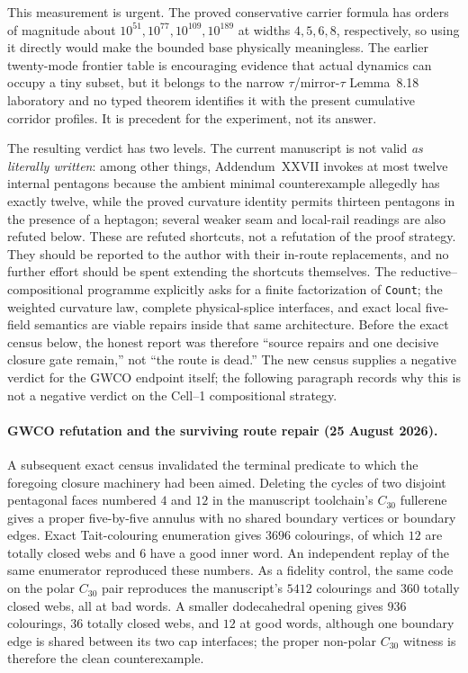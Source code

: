 \documentclass[11pt]{article}
\theoremstyle{definition}
\begin{document}
This measurement is urgent.  The proved conservative carrier formula has
orders of magnitude about $10^{51},10^{77},10^{109},10^{189}$ at widths
$4,5,6,8$, respectively, so using it directly would make the bounded base
physically meaningless.  The earlier twenty-mode frontier table is encouraging
evidence that actual dynamics can occupy a tiny subset, but it belongs to the
narrow $\tau$/mirror-$\tau$ Lemma~8.18 laboratory and no typed theorem identifies
it with the present cumulative corridor profiles.  It is precedent for the
experiment, not its answer.

The resulting verdict has two levels.  The current manuscript is not valid
\emph{as literally written}: among other things, Addendum~XXVII invokes at most
twelve internal pentagons because the ambient minimal counterexample allegedly
has exactly twelve, while the proved curvature identity permits thirteen
pentagons in the presence of a heptagon; several weaker seam and local-rail
readings are also refuted below.  These are refuted shortcuts, not a refutation
of the proof strategy.  They should be reported to the author with their
in-route replacements, and no further effort should be spent extending the
shortcuts themselves.  The reductive--compositional programme explicitly asks
for a finite factorization of \texttt{Count}; the weighted curvature law,
complete physical-splice interfaces, and exact local five-field semantics are
viable repairs inside that same architecture.  Before the exact census below,
the honest report was therefore ``source repairs and one decisive closure gate
remain,'' not ``the route is dead.''  The new census supplies a negative verdict
for the GWCO endpoint itself; the following paragraph records why this is not a
negative verdict on the Cell--1 compositional strategy.

\paragraph{GWCO refutation and the surviving route repair (25 August 2026).}
A subsequent exact census invalidated the terminal predicate to which the
foregoing closure machinery had been aimed.  Deleting the cycles of two
disjoint pentagonal faces numbered $4$ and $12$ in the manuscript toolchain's
$C_{30}$ fullerene gives a proper five-by-five annulus with no shared boundary
vertices or boundary edges.  Exact Tait-colouring enumeration gives $3696$
colourings, of which $12$ are totally closed webs and $6$ have a good inner
word.  An independent replay of the same enumerator reproduced these numbers.
As a fidelity control, the same code on the polar $C_{30}$ pair reproduces the
manuscript's $5412$ colourings and $360$ totally closed webs, all at bad words.
A smaller dodecahedral opening gives $936$ colourings, $36$ totally closed
webs, and $12$ at good words, although one boundary edge is shared between its
two cap interfaces; the proper non-polar $C_{30}$ witness is therefore the
clean counterexample.
\end{document}

